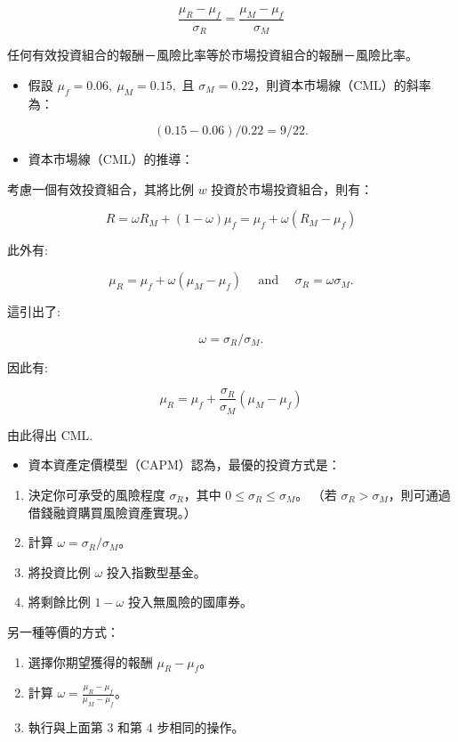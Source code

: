\documentclass[letterpaper]{article}
\begin{document}
$$
\frac{\mu_{R}-\mu_{f}}{\sigma_{R}}=\frac{\mu_{M}-\mu_{f}}{\sigma_{M}}
$$

任何有效投資組合的報酬－風險比率等於市場投資組合的報酬－風險比率。

\begin{itemize}
	\item 假設 $\mu_{f} = 0.06,\ \mu_{M} = 0.15,$ 且 $\sigma_{M} = 0.22$，則資本市場線（CML）的斜率為：
\end{itemize}


$$
(0.15-0.06) / 0.22=9 / 22 .
$$
\begin{itemize}
	\item 資本市場線（CML）的推導：
\end{itemize}

考慮一個有效投資組合，其將比例 $w$ 投資於市場投資組合，則有：

$$
R=\omega R_{M}+(1-\omega) \mu_{f}=\mu_{f}+\omega\left(R_{M}-\mu_{f}\right)
$$

此外有:

$$
\mu_{R}=\mu_{f}+\omega\left(\mu_{M}-\mu_{f}\right) \quad \text { and } \quad \sigma_{R}=\omega \sigma_{M} .
$$

這引出了:

$$
\omega=\sigma_{R} / \sigma_{M} .
$$

因此有:

$$
\mu_{R}=\mu_{f}+\frac{\sigma_{R}}{\sigma_{M}}\left(\mu_{M}-\mu_{f}\right)
$$

由此得出 CML. 


\begin{itemize}
	\item 資本資產定價模型（CAPM）認為，最優的投資方式是：
\end{itemize}

\begin{enumerate}
	\item 決定你可承受的風險程度 $\sigma_{R}$，其中 $0 \leq \sigma_{R} \leq \sigma_{M}$。
	（若 $\sigma_{R}>\sigma_{M}$，則可通過借錢融資購買風險資產實現。）
	\item 計算 $\omega=\sigma_{R} / \sigma_{M}$。
	\item 將投資比例 $\omega$ 投入指數型基金。
	\item 將剩餘比例 $1-\omega$ 投入無風險的國庫券。
\end{enumerate}

另一種等價的方式：

\begin{enumerate}
	\item 選擇你期望獲得的報酬 $\mu_{R}-\mu_{f}$。
	\item 計算 $\omega=\frac{\mu_{R}-\mu_{f}}{\mu_{M}-\mu_{f}}$。
	\item 執行與上面第 3 和第 4 步相同的操作。
\end{enumerate}
\end{document}
